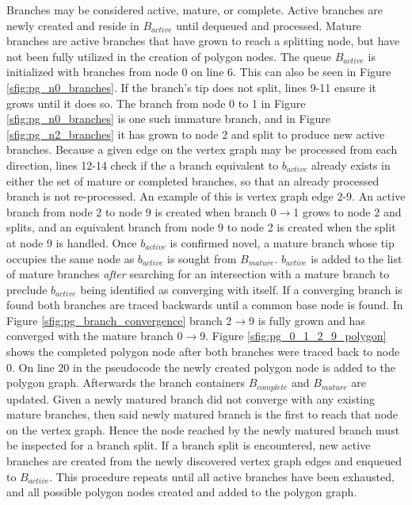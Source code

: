 Branches may be considered active, mature, or complete.
Active branches are newly created and reside in $B_{active}$ until dequeued and processed.
Mature branches are active branches that have grown to reach a splitting node, but have not been fully utilized in the creation of polygon nodes.
The queue $B_{active}$ is initialized with branches from node 0 on line 6.
This can also be seen in Figure \ref{sfig:pg_n0_branches}.
If the branch's tip does not split, lines 9-11 ensure it grows until it does so.
The branch from node 0 to 1 in Figure \ref{sfig:pg_n0_branches} is one such immature branch, and in Figure \ref{sfig:pg_n2_branches} it has grown to node 2 and split to produce new active branches.
Because a given edge on the vertex graph may be processed from each direction, lines 12-14 check if the a branch equivalent to $b_{active}$ already exists in either the set of mature or completed branches, so that an already processed branch is not re-processed.
An example of this is vertex graph edge 2-9.
An active branch from node 2 to node 9 is created when branch 0$\rightarrow$1 grows to node 2 and splits, and an equivalent branch from node 9 to node 2 is created when the split at node 9 is handled.
Once $b_{active}$ is confirmed novel, a mature branch whose tip occupies the same node as $b_{active}$ is sought from $B_{mature}$.
$b_{active}$ is added to the list of mature branches \textit{after} searching for an intersection with a mature branch to preclude $b_{active}$ being identified as converging with itself.
If a converging branch is found both branches are traced backwards until a common base node is found.
In Figure \ref{sfig:pg_branch_convergence} branch 2$\rightarrow$9 is fully grown and has converged with the mature branch 0$\rightarrow$9.
Figure \ref{sfig:pg_0_1_2_9_polygon} shows the completed polygon node after both branches were traced back to node 0.
On line 20 in the pseudocode the newly created polygon node is added to the polygon graph.
Afterwards the branch containers $B_{complete}$ and $B_{mature}$ are updated.
Given a newly matured branch did not converge with any existing mature branches, then said newly matured branch is the first to reach that node on the vertex graph.
Hence the node reached by the newly matured branch must be inspected for a branch split.
If a branch split is encountered, new active branches are created from the newly discovered vertex graph edges and enqueued to $B_{active}$.
This procedure repeats until all active branches have been exhausted, and all possible polygon nodes created and added to the polygon graph.

